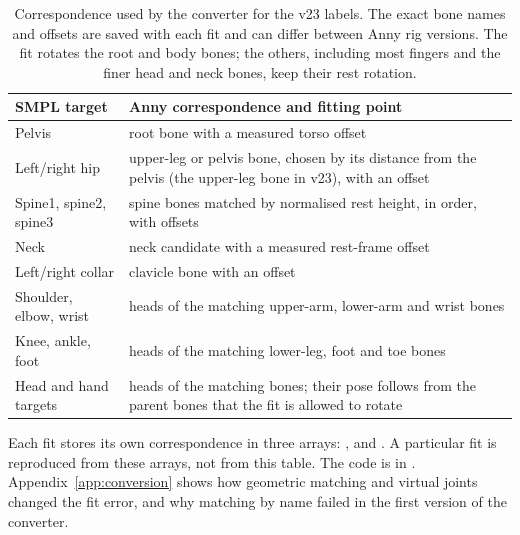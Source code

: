 \begin{table}[htbp]
\centering\small
\begin{tabular}{@{}>{\raggedright}p{3.4cm}>{\raggedright\arraybackslash}p{8.7cm}@{}}
\toprule
SMPL target & Anny correspondence and fitting point \\
\midrule
Pelvis & root bone with a measured torso offset \\
Left/right hip & upper-leg or pelvis bone, chosen by its distance from the pelvis (the upper-leg bone in v23),
with an offset \\
Spine1, spine2, spine3 & spine bones matched by normalised rest height, in order, with offsets \\
Neck & neck candidate with a measured rest-frame offset \\
Left/right collar & clavicle bone with an offset \\
Shoulder, elbow, wrist & heads of the matching upper-arm, lower-arm and wrist bones \\
Knee, ankle, foot & heads of the matching lower-leg, foot and toe bones \\
Head and hand targets & heads of the matching bones; their pose follows from the parent bones that the fit is
allowed to rotate \\
\bottomrule
\end{tabular}
\caption[Construction of the SMPL--Anny correspondence]{Correspondence used by the converter for the v23 labels.
The exact bone names and offsets are saved with each fit and can differ between Anny rig versions. The fit rotates the
root and \DataFittedBones{} body bones; the others, including most fingers and the finer head and neck bones, keep
their rest rotation.}
\label{tab:mapping}
\end{table}

Each fit stores its own correspondence in three arrays: ,  and
. A particular fit is reproduced from these arrays, not from this table. The code is in
. Appendix~\ref{app:conversion} shows how geometric matching and virtual joints
changed the fit error, and why matching by name failed in the first version of the converter.
